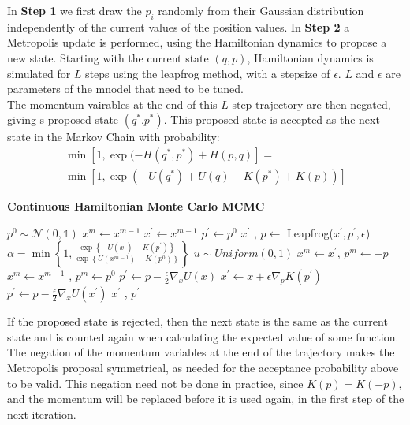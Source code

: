 \documentclass[twoside]{article}
\begin{document}
In \textbf{Step 1} we first draw the $p_{i}$ randomly from their Gaussian distribution independently of the current values of the position values. 
In \textbf{Step 2} a Metropolis update is performed, using the Hamiltonian dynamics to propose a new state. Starting with the current state $(q,p)$, Hamiltonian dynamics is simulated for $L$ steps using the leapfrog method, with a stepsize of $\epsilon$. $L$ and $\epsilon$ are parameters of the mnodel that need to be tuned.\\
The momentum vairables at the end of this $L$-step trajectory are then negated, giving s proposed state $(q^{*}. p^{*})$. This proposed state is accepted as the next state in the Markov Chain with probability: \begin{multline}
\min[1, \exp(-H(q^{*}, p^{*}) + H(p,q)] =\\
\min[1, \exp(-U(q^{*}) + U(q) - K(p^{*}) + K(p))]
\end{multline} 
\begin{algorithm}
	\label{alg:simpHMC}
	\caption{\textbf{Continuous Hamiltonian Monte Carlo MCMC}}
	\begin{algorithmic}[1]
		\State $ p^{0} \sim \mathcal{N}(0,\mathds{1})$
		\State $ x^{m} \gets x^{m-1}$
		\State $x^{'} \gets x^{m-1}$
		\State $ p^{'} \gets p^{0}$
		\State $x^{'}$ , $p \gets$ Leapfrog($x^{'}, p^{'}, \epsilon$)
		\EndFor
		\State $\alpha = \min\left\{1, \frac{\exp \left\{-U(x^{'}) - K(p^{'})\right\}}{\exp \left\{U(x^{m-1}) - K(p^{0})\right\}}\right\}$
		\State $u \sim Uniform(0,1)$
		\State \Return $ x^{m} \gets x^{'}$, $p^{m} \gets -p $  
		\Else
		\State \Return $x^{m}  \gets x^{m-1}$ , $p^{m} \gets p^{0}$ 
		\EndIf
		\EndFor
		\State $p^{'} \gets p - \frac{\epsilon}{2}\nabla_{x} U(x)$ 
		\State $x^{'} \gets x + \epsilon \nabla_{p} K(p^{'})$  
		\State $p^{'} \gets p - \frac{\epsilon}{2}\nabla_{x}U(x^{'})$ 
		\State \Return $x^{'}$ , $p^{'}$
	\end{algorithmic} 
\end{algorithm}
If the proposed state is rejected, then the next state is the same as the current state and is counted again when calculating the expected value of some function. 
The negation of the momentum variables at the end of the trajectory makes the Metropolis proposal symmetrical, as needed for the acceptance probability above to be valid. This negation need not be done in practice, since $K(p) = K(-p)$, and the momentum will be replaced before it is used again, in the first step of the next iteration.
\end{document}
